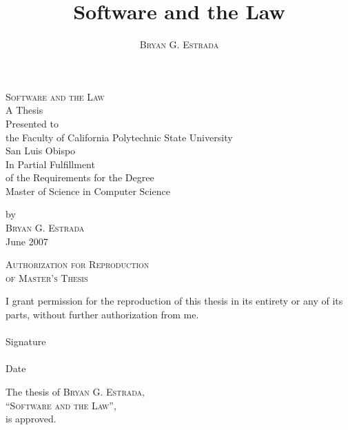 \documentclass[12pt]{report}
\newcommand{\thetitle}{Software and the Law}
\newcommand{\theauthor}{\textsc{Bryan G. Estrada}}
\newcommand{\theuniversity}{California Polytechnic State University}
\newcommand{\thecity}{San Luis Obispo}
\newcommand{\thedegree}{Master of Science in Computer Science}
\newcommand{\thedate}{June 2007}
\begin{document}
\title{\thetitle}
\author{\theauthor}

\doublespace


\begin{titlepage}
\thispagestyle{empty}
\begin{center}

\textsc{\LARGE \thetitle}\\[4cm]

A Thesis\\
Presented to\\
the Faculty of \theuniversity\\
\thecity\\[4cm]

In Partial Fulfillment\\
of the Requirements for the Degree\\
\thedegree

\vfill
by\\
\theauthor\\
\thedate
\end{center}

\end{titlepage}

\begin{center}
\textsc{\large Authorization for Reproduction\\of Master's Thesis}\\[3cm]
\end{center}

\noindent I grant permission for the reproduction of this thesis in its entirety
or any of its parts, without further authorization from me.\\[4cm]

\singlespace
\noindent\makebox[4in]{\hrulefill}\\
Signature\\[2cm]

\noindent\makebox[4in]{\hrulefill}\\
Date
\doublespace
\newpage

\begin{center}
The thesis of \theauthor,\\
``\textsc{\large \thetitle}'',\\
is approved.\\[4cm]
\end{center}
\end{document}
